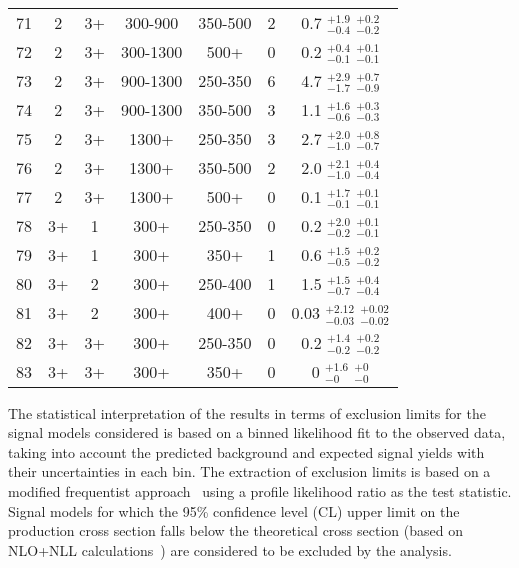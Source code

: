 \begin{table}[tbp]
{\begin{tabular}{ccccc  cc}
        71 &          2 &         3+ &    300-900 &    350-500 &          2 &   0.7 $^{ +1.9} _{ -0.4}$ $^{ +0.2} _{ -0.2}$ \\
        72 &          2 &         3+ &   300-1300 &       500+ &          0 &   0.2 $^{ +0.4} _{ -0.1}$ $^{ +0.1} _{ -0.1}$ \\
        73 &          2 &         3+ &   900-1300 &    250-350 &          6 &   4.7 $^{ +2.9} _{ -1.7}$ $^{ +0.7} _{ -0.9}$ \\
        74 &          2 &         3+ &   900-1300 &    350-500 &          3 &   1.1 $^{ +1.6} _{ -0.6}$ $^{ +0.3} _{ -0.3}$ \\
        75 &          2 &         3+ &      1300+ &    250-350 &          3 &   2.7 $^{ +2.0} _{ -1.0}$ $^{ +0.8} _{ -0.7}$ \\
        76 &          2 &         3+ &      1300+ &    350-500 &          2 &   2.0 $^{ +2.1} _{ -1.0}$ $^{ +0.4} _{ -0.4}$ \\
        77 &          2 &         3+ &      1300+ &       500+ &          0 &   0.1 $^{ +1.7} _{ -0.1}$ $^{ +0.1} _{ -0.1}$ \\
 \hline
        78 &         3+ &          1 &       300+ &    250-350 &          0 &   0.2 $^{ +2.0} _{- 0.2}$ $^{ +0.1} _{ -0.1}$ \\
        79 &         3+ &          1 &       300+ &       350+ &          1 &   0.6 $^{ +1.5} _{ -0.5}$ $^{ +0.2} _{ -0.2}$ \\
 \hline
        80 &         3+ &          2 &       300+ &    250-400 &          1 &   1.5 $^{ +1.5} _{ -0.7}$ $^{ +0.4} _{ -0.4}$ \\
        81 &         3+ &          2 &       300+ &       400+ &          0 &  0.03 $^{+2.12} _{-0.03}$ $^{+0.02} _{-0.02}$ \\
 \hline
        82 &         3+ &         3+ &       300+ &    250-350 &          0 &   0.2 $^{ +1.4} _{ -0.2}$ $^{ +0.2} _{ -0.2}$ \\
        83 &         3+ &         3+ &       300+ &       350+ &          0 &     0 $^{ +1.6} _{   -0}$ $^{   +0} _{   -0}$ \\
 \hline
\end{tabular}
}
\end{table}


The statistical interpretation of the results in terms of exclusion limits for the signal models considered is based on a binned likelihood fit to the observed data, taking into account the predicted background and expected signal yields with their uncertainties in each bin. The extraction of exclusion limits is based on a modified frequentist approach~\cite{CLs,Read:2002hq,Junk:1999kv,Cowan:2010js} using a profile likelihood ratio as the test statistic. 
Signal models for which the 95\% confidence level (CL) upper limit on the production cross section falls below the theoretical cross section (based on NLO+NLL calculations~\cite{Borschensky:2014cia}) are considered to be excluded by the analysis.

